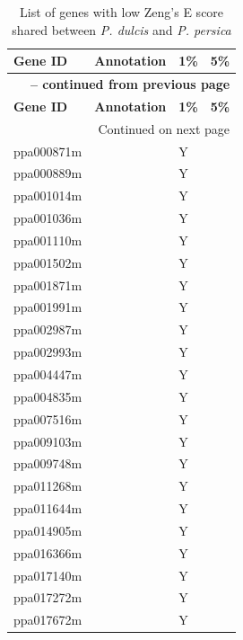 \documentclass[12pt]{article}
\begin{document}
\begin{center}
\begin{longtable}{llll}
\caption{List of genes with low Zeng's E score shared between \emph{P. dulcis} and \emph{P. persica}} \label{sampledetails} \\
\hline \hline
\multicolumn{1}{l}{\textbf{Gene ID}} &
\multicolumn{1}{l}{\textbf{Annotation}} &
\multicolumn{1}{l}{\textbf{1\%}} &
\multicolumn{1}{l}{\textbf{5\%}}\\
\hline 
\endfirsthead

\multicolumn{4}{r}{{\bfseries \tablename\ \thetable{} -- continued from previous page}} \\
\hline 
\multicolumn{1}{l}{\textbf{Gene ID}} &
\multicolumn{1}{l}{\textbf{Annotation}} &
\multicolumn{1}{l}{\textbf{1\%}} &
\multicolumn{1}{l}{\textbf{5\%}} \\ \hline 
\endhead
%
\hline \multicolumn{4}{r}{{Continued on next page}} \\ \hline \hline
\endfoot
\hline \hline
\endlastfoot
	ppa000871m & &Y & \\
	ppa000889m & &Y & \\
	ppa001014m & &Y & \\
	ppa001036m & &Y & \\
	ppa001110m & &Y & \\
	ppa001502m & &Y & \\
	ppa001871m & &Y & \\
	ppa001991m & &Y & \\
	ppa002987m & &Y & \\
	ppa002993m & &Y & \\
	ppa004447m & &Y & \\
	ppa004835m & &Y & \\
	ppa007516m & &Y & \\
	ppa009103m & &Y & \\
	ppa009748m & &Y & \\
	ppa011268m & &Y & \\
	ppa011644m & &Y & \\
	ppa014905m & &Y & \\
	ppa016366m & &Y & \\
	ppa017140m & &Y & \\
	ppa017272m & &Y & \\
	ppa017672m & &Y & \\

\end{longtable}
\end{center}
\end{document}
